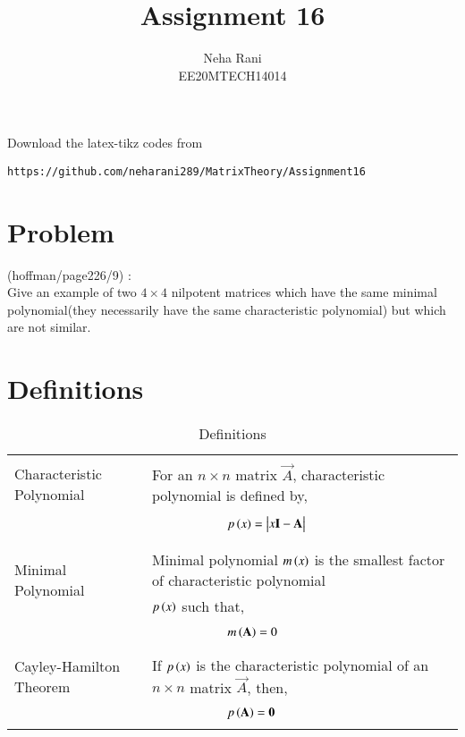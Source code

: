 \documentclass[journal,12pt]{IEEEtran}
\begin{document}
     \def\rightbox#1{\makebox[0in][r]{#1}}
     \def\centbox#1{\makebox[0in]{#1}}
     \def\topbox#1{\raisebox{-\baselineskip}[0in][0in]{#1}}
     \def\midbox#1{\raisebox{-0.5\baselineskip}[0in][0in]{#1}}
\vspace{3cm}
\title{Assignment 16}
\author{Neha Rani\\EE20MTECH14014}
\maketitle
\bigskip
\renewcommand{\thefigure}{\theenumi}
\renewcommand{\thetable}{\theenumi}
%
Download the latex-tikz codes from 
%
\begin{lstlisting}
https://github.com/neharani289/MatrixTheory/Assignment16
\end{lstlisting}
\section{\textbf{Problem}}
%
(hoffman/page226/9) : 
\bigskip\\
Give an example of two $4\times 4$ nilpotent matrices which have the same minimal polynomial(they necessarily have the same characteristic polynomial) but which are not similar. 
\bigskip
\section{\textbf{Definitions}}
\bigskip
\renewcommand{\thetable}{1}
\begin{table}[ht!]
\centering
\begin{tabular}{|p{5cm}|p{13cm}|}
    \hline
	\multirow{3}{*}{Characteristic Polynomial} 
	& \\
	& For an $n\times n$ matrix $\vec{A}$, characteristic polynomial is defined by,\\
	&\\
	& $\qquad\qquad\qquad p\brak{x}=\mydet{x\Vec{I}-\Vec{A}}$\\
	&\\
	\hline

	\multirow{3}{*}{Minimal Polynomial} 
	&\\
	& Minimal polynomial $m\left(x\right)$ is the smallest factor of characteristic polynomial\\
	& $p\left(x\right)$ such that,\\
	&\\
	& $\qquad \qquad \qquad m\left(\mathbf{A}\right)=0$\\
	&\\
    \hline
    \multirow{3}{*}{Cayley-Hamilton Theorem}
    &\\
    & If $p\left(x\right)$ is the characteristic polynomial of an $n\times n$ matrix $\vec{A}$, then,\\
    &\\
    &$\qquad \qquad \qquad p\left(\mathbf{A}\right)=\mathbf{0}$\\
    &\\
    \hline
\end{tabular}
\label{table:1}
    \caption{Definitions}
\end{table}
\newpage
\end{document}
